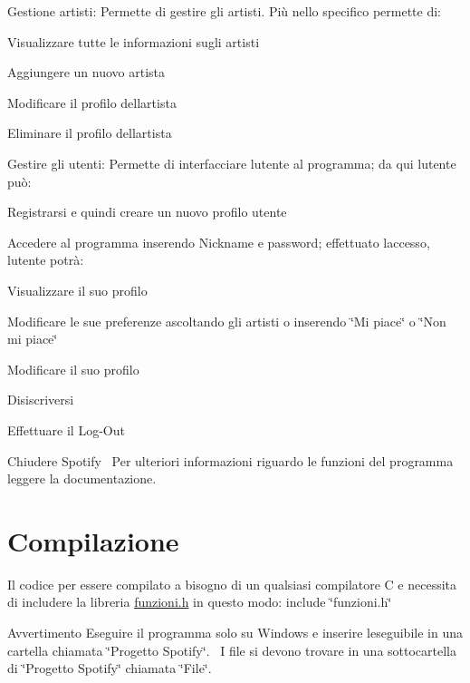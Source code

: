 \begin{DoxyEnumerate}
\item Gestione artisti\+: Permette di gestire gli artisti. Più nello specifico permette di\+:
\begin{DoxyEnumerate}
\item Visualizzare tutte le informazioni sugli artisti
\item Aggiungere un nuovo artista
\item Modificare il profilo dell\textquotesingle{}artista
\item Eliminare il profilo dell\textquotesingle{}artista
\end{DoxyEnumerate}
\item Gestire gli utenti\+: Permette di interfacciare l\textquotesingle{}utente al programma; da qui l\textquotesingle{}utente può\+:
\begin{DoxyEnumerate}
\item Registrarsi e quindi creare un nuovo profilo utente
\item Accedere al programma inserendo Nickname e password; effettuato l\textquotesingle{}accesso, l\textquotesingle{}utente potrà\+:
\begin{DoxyEnumerate}
\item Visualizzare il suo profilo
\item Modificare le sue preferenze ascoltando gli artisti o inserendo \char`\"{}\+Mi piace\char`\"{} o \char`\"{}\+Non mi piace\char`\"{}
\item Modificare il suo profilo
\item Disiscriversi
\item Effettuare il Log-\/\+Out
\end{DoxyEnumerate}
\end{DoxyEnumerate}
\item Chiudere Spotify~\newline
 Per ulteriori informazioni riguardo le funzioni del programma leggere la documentazione.
\end{DoxyEnumerate}\hypertarget{index_comp_sec}{}\section{Compilazione}\label{index_comp_sec}
Il codice per essere compilato a bisogno di un qualsiasi compilatore C e necessita di includere la libreria \mbox{\hyperlink{funzioni_8h}{funzioni.\+h}} in questo modo\+: include \char`\"{}funzioni.\+h\char`\"{} \begin{DoxyWarning}{Avvertimento}
Eseguire il programma solo su Windows e inserire l\textquotesingle{}eseguibile in una cartella chiamata \char`\"{}\+Progetto Spotify\char`\"{}.~\newline
 I file si devono trovare in una sottocartella di \char`\"{}\+Progetto Spotify\char`\"{} chiamata \char`\"{}\+File\char`\"{}. 
\end{DoxyWarning}
